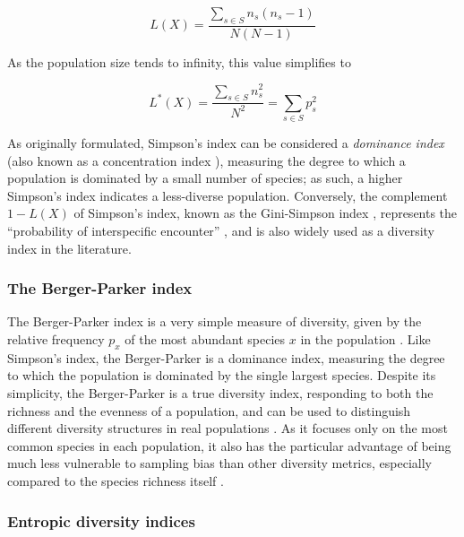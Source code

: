 \begin{equation}
L(X) = \frac{\sum_{s \in S} n_s(n_s-1)}{N(N-1)}
\label{eq:simpson_finite}
\end{equation} 

\noindent As the population size tends to infinity, this value simplifies to

\begin{equation}
L^*(X) = \frac{\sum_{s \in S} n_s^2}{N^2} = \sum_{s \in S} p_s^2
\label{eq:simpson_finite}
\end{equation} 

\noindent As originally formulated, Simpson's index can be considered a \textit{dominance index} (also known as a concentration  index \citep{simpson1949diversity}), measuring the degree to which a population is dominated by a small number of species; as such, a higher Simpson's index indicates a less-diverse population. Conversely, the complement $1-L(X)$ of Simpson's index, known as the Gini-Simpson index \citep{jost2006entropy}, represents the ``probability of interspecific encounter'' \citep{peet1974diversity}, and is also widely used as a diversity index in the literature.

\subsubsection{The Berger-Parker index}
\label{app:diversity-unitary-simple-berger}

The Berger-Parker index is a very simple measure of diversity, given by the relative frequency $p_x$ of the most abundant species $x$ in the population \parencite{berger1970diversity,caruso2008bergerparker}. Like Simpson's index, the Berger-Parker is a dominance index, measuring the degree to which the population is dominated by the single largest species. Despite its simplicity, the Berger-Parker is a true diversity index, responding to both the richness and the evenness of a population, and can be used to distinguish different diversity structures in real populations \parencite{caruso2008bergerparker}. As it focuses only on the most common species in each population, it also has the particular advantage of being much less vulnerable to sampling bias than other diversity metrics, especially compared to the species richness itself \parencite{berger1970diversity}.

\subsubsection{Entropic diversity indices}
\label{app:diversity-unitary-simple-entropy}

